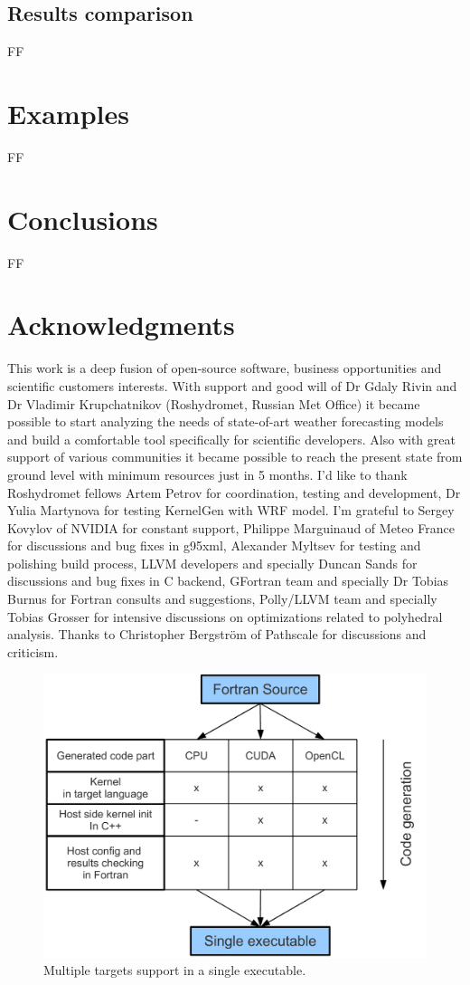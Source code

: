 \documentclass[a4,12pt]{article}
\begin{document}
\subsection{Results comparison}

FF

\section{Examples}

FF

\section{Conclusions}

FF

\section{Acknowledgments}

This work is a deep fusion of open-source software, business opportunities and scientific customers interests. With support and good will of Dr Gdaly Rivin and Dr Vladimir Krupchatnikov (Roshydromet, Russian Met Office) it became possible to start analyzing the needs of state-of-art weather forecasting models and build a comfortable tool specifically for scientific developers. Also with great support of various communities it became possible to reach the present state from ground level with minimum resources just in 5 months. I'd like to thank Roshydromet fellows Artem Petrov for coordination, testing and development, Dr Yulia Martynova for testing KernelGen with WRF model. I'm grateful to Sergey Kovylov of NVIDIA for constant support, Philippe Marguinaud of Meteo France for discussions and bug fixes in g95xml, Alexander Myltsev for testing and polishing build process, LLVM developers and specially Duncan Sands for discussions and bug fixes in C backend, GFortran team and specially Dr Tobias Burnus for Fortran consults and suggestions, Polly/LLVM team and specially Tobias Grosser for intensive discussions on optimizations related to polyhedral analysis. Thanks to Christopher Bergström of Pathscale for discussions and criticism.

\begin{figure}
\centering
\includegraphics[scale=0.5]{figures/portability.pdf}
\caption{Multiple targets support in a single executable.}
\label{fig:portability}
\end{figure}
\end{document}
